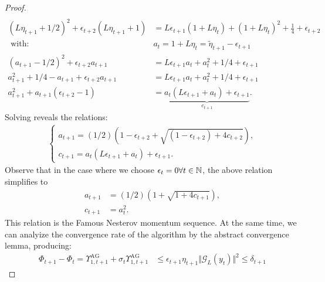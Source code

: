 \begin{proof}
\begin{align*}
            \\
            (L\eta_{t + 1} + 1/2)^2 + \epsilon_{t + 2}(L \eta_{t + 1} + 1)
            &= 
            L \epsilon_{t + 1}(1 + L \eta_t) + (1 + L\eta_t)^2
            + \frac{1}{4} + \epsilon_{t + 2}
            \\
            \text{ with: } & a_t = 1 + L \eta_t = \tilde \eta_{t + 1} - \epsilon_{t + 1}
            \\
            (a_{t + 1} - 1/2)^2 + \epsilon_{t + 2}a_{t + 1}
            &= 
            L \epsilon_{t + 1}a_t + a_t^2 + 1/4 + \epsilon_{t + 1}
            \\
            a_{t + 1}^2 + 1/4 - a_{t + 1} + \epsilon_{t + 2}a_{t + 1}
            &= 
            L \epsilon_{t + 1}a_t + a_t^2 + 1/4 + \epsilon_{t + 1}
            \\
            a_{t + 1}^2 + a_{t + 1}(\epsilon_{t + 2} - 1)
            &= 
            \underbrace{
                a_t(L \epsilon_{t + 1} + a_t) + \epsilon_{t + 1}
            }_{c_{t + 1}}. 
        \end{align*}
        Solving reveals the relations: 
        \begin{align*}
            \begin{cases}
                a_{t + 1} = (1/2)\left(
                1 - \epsilon_{t + 2} + \sqrt{(1 - \epsilon_{t + 2}) + 4 c_{t + 2}}
                \right), 
                \\
                c_{t + 1} = a_t (L \epsilon_{t + 1} + a_t) + \epsilon_{t + 1}. 
            \end{cases}
        \end{align*}
        Observe that in the case where we choose $\epsilon_t = 0 \forall t \in \mathbb N$, the above relation simplifies to 
        \begin{align*}
            a_{t + 1} &= (1/2)\left(
                1 + \sqrt{1 + 4 c_{t + 1}}
            \right), 
            \\
            c_{t + 1} &= a_t^2. 
        \end{align*}
        This relation is the Famous Nesterov momentum sequence. 
        At the same time, we can analyize the convergence rate of the algorithm by the abstract convergence lemma, producing: 
        \begin{align*}
            \Phi_{t + 1} - \Phi_t =
            \Upsilon_{1, t + 1}^\text{AG} + 
            \sigma_t\Upsilon_{1, t + 1}^{\text{AG}} 
            &\le \epsilon_{t + 1}\eta_{t + 1} \Vert \mathcal G_L(y_t)\Vert^2 \le \delta_{t + 1}

\end{align*}
\end{proof}
